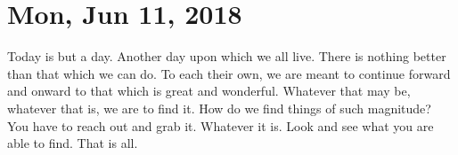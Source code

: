 \section{Mon, Jun 11, 2018}

Today is but a day. Another day upon which we all live. There is nothing better
than that which we can do. To each their own, we are meant to continue forward
and onward to that which is great and wonderful. Whatever that may be, whatever
that is, we are to find it. How do we find things of such magnitude? You have to
reach out and grab it. Whatever it is. Look and see what you are able to find.
That is all.